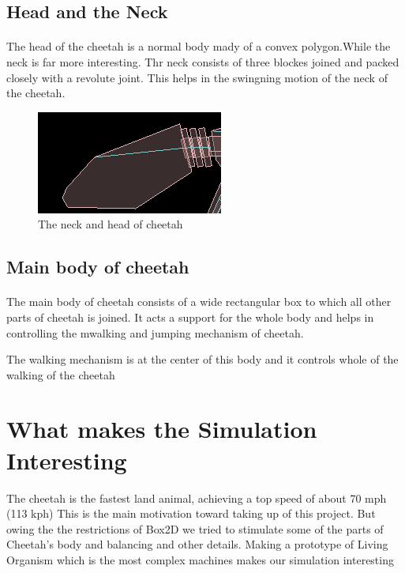 \documentclass[11pt]{article}
\begin{document}
\subsection{Head and the Neck}
\paragraph{} 
The head of the cheetah is a normal body mady of a convex polygon.While the neck is far more interesting. Thr neck consists of three blockes joined and packed closely with a revolute joint. This helps in the swingning motion of the neck of the cheetah.
\\
\begin{figure}[!ht]
    \centering
        \includegraphics[scale=0.8]{head.png}
        \caption{The neck and head of cheetah}
\end{figure}
\subsection{Main body of cheetah}
\paragraph{} 
The main body of cheetah consists of a wide rectangular box to which all other parts of cheetah is joined. It acts a support for the whole body and helps in controlling the mwalking and jumping mechanism of cheetah.

The walking mechanism is at the center of this body and it controls whole of the walking of the cheetah

\section{What makes the Simulation Interesting}

The cheetah is the fastest land animal, achieving a top speed of about 70 mph (113 kph)\cite{facts} This is the main motivation toward taking up of this project. But owing the the restrictions of Box2D we tried to stimulate some of the parts of Cheetah's body and balancing and other details. Making a prototype of Living Organism which is the most complex machines makes our simulation interesting\\
\end{document}
